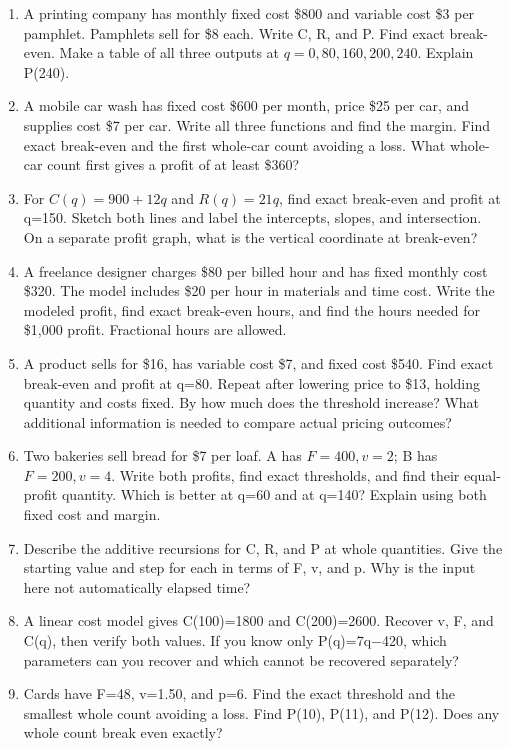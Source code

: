 \documentclass[11pt,letterpaper]{article}
\begin{document}
\begin{enumerate}
\item A printing company has monthly fixed cost \$800 and variable cost \$3 per pamphlet. Pamphlets sell for \$8 each. Write C, R, and P. Find exact break-even. Make a table of all three outputs at $q=0,80,160,200,240$. Explain P(240).
\item A mobile car wash has fixed cost \$600 per month, price \$25 per car, and supplies cost \$7 per car. Write all three functions and find the margin. Find exact break-even and the first whole-car count avoiding a loss. What whole-car count first gives a profit of at least \$360?
\item For $C(q)=900+12q$ and $R(q)=21q$, find exact break-even and profit at q=150. Sketch both lines and label the intercepts, slopes, and intersection. On a separate profit graph, what is the vertical coordinate at break-even?
\item A freelance designer charges \$80 per billed hour and has fixed monthly cost \$320. The model includes \$20 per hour in materials and time cost. Write the modeled profit, find exact break-even hours, and find the hours needed for \$1,000 profit. Fractional hours are allowed.
\item A product sells for \$16, has variable cost \$7, and fixed cost \$540. Find exact break-even and profit at q=80. Repeat after lowering price to \$13, holding quantity and costs fixed. By how much does the threshold increase? What additional information is needed to compare actual pricing outcomes?
\item Two bakeries sell bread for \$7 per loaf. A has $F=400,v=2$; B has $F=200,v=4$. Write both profits, find exact thresholds, and find their equal-profit quantity. Which is better at q=60 and at q=140? Explain using both fixed cost and margin.
\item Describe the additive recursions for C, R, and P at whole quantities. Give the starting value and step for each in terms of F, v, and p. Why is the input here not automatically elapsed time?
\item A linear cost model gives C(100)=1800 and C(200)=2600. Recover v, F, and C(q), then verify both values. If you know only P(q)=7q\ensuremath{-}420, which parameters can you recover and which cannot be recovered separately?
\newpage
\item Cards have F=48, v=1.50, and p=6. Find the exact threshold and the smallest whole count avoiding a loss. Find P(10), P(11), and P(12). Does any whole count break even exactly?

\end{enumerate}
\end{document}
